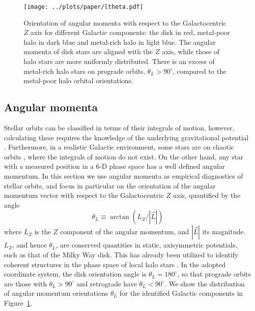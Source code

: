 \documentclass[apj, twocolappendix, numberedappendix, appendixfloats]{emulateapj}
\begin{document}
\begin{figure}
\begin{center}
\texttt{[image: ../plots/paper/ltheta.pdf]}
\caption{Orientation of angular momenta with respect to the Galactocentric $Z$ axis for different Galactic components: the disk in red, metal-poor halo in dark blue and metal-rich halo in light blue.
The angular momenta of disk stars are aligned with the $Z$ axis, while those of halo stars are more uniformly distributed.
There is an excess of metal-rich halo stars on prograde orbits, $\theta_L>90^\circ$, compared to the metal-poor halo orbital orientations.}
\label{fig:ltheta}
\end{center}
\end{figure}

\subsection{Angular momenta}
\label{sec:l}
Stellar orbits can be classified in terms of their integrals of motion, however, calculating these requires the knowledge of the underlying gravitational potential \citep{bt2008}.
Furthermore, in a realistic Galactic environment, some stars are on chaotic orbits \citep[e.g.,][]{price-whelan2016}, where the integrals of motion do not exist.
On the other hand, any star with a measured position in a 6-D phase space has a well defined angular momentum.
In this section we use angular momenta as empirical diagnostics of stellar orbits, and focus in particular on the orientation of the angular momentum vector with respect to the Galactocentric $Z$ axis, quantified by the angle
\begin{equation}
\theta_L \equiv \arctan(L_Z/|\vec{L}|)
\label{eq:thetal}
\end{equation}
where $L_Z$ is the $Z$ component of the angular momentum, and $|\vec{L}|$ its magnitude.
$L_Z$, and hence $\theta_L$, are conserved quantities in static, axisymmetric potentials, such as that of the Milky Way disk.
This has already been utilized to identify coherent structures in the phase space of local halo stars \citep[e.g.,][]{helmi1999, smith2009}.
In the adopted coordinate system, the disk orientation angle is $\theta_L=180^\circ$, so that prograde orbits are those with $\theta_L>90^\circ$ and retrograde have $\theta_L<90^\circ$.
We show the distribution of angular momentum orientations $\theta_L$ for the identified Galactic components in Figure~\ref{fig:ltheta}.
\end{document}
